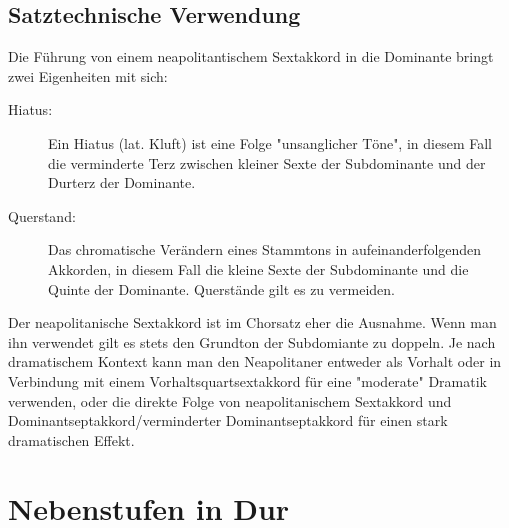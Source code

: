 \documentclass[a4paper]{article}
\begin{document}
	\subsection{Satztechnische Verwendung}
	Die Führung von einem neapolitantischem Sextakkord in die Dominante bringt zwei Eigenheiten mit sich:
	\begin{description}
		\item[Hiatus:] Ein Hiatus (lat. Kluft) ist eine Folge "{}unsanglicher Töne", in diesem Fall die verminderte Terz zwischen kleiner Sexte der Subdominante und der Durterz der Dominante.
		\item[Querstand:] Das chromatische Verändern eines Stammtons in aufeinanderfolgenden Akkorden, in diesem Fall die kleine Sexte der Subdominante und die Quinte der Dominante. Querstände gilt es zu vermeiden.
	\end{description}
	Der neapolitanische Sextakkord ist im Chorsatz eher die Ausnahme. Wenn man ihn verwendet gilt es stets den Grundton der Subdomiante zu doppeln. Je nach dramatischem Kontext kann man den Neapolitaner entweder als Vorhalt oder in Verbindung mit einem Vorhaltsquartsextakkord für eine "moderate" Dramatik verwenden, oder die direkte Folge von neapolitanischem Sextakkord und Dominantseptakkord/verminderter Dominantseptakkord für einen stark dramatischen Effekt.
	
	\section{Nebenstufen in Dur}
	
\end{document}
